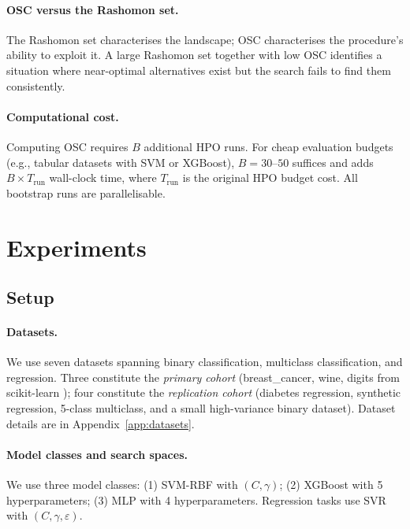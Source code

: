 \documentclass[twoside]{article}
\begin{document}
\paragraph{OSC versus the Rashomon set.}
The Rashomon set characterises the landscape; OSC characterises the
procedure's ability to exploit it. A large Rashomon set together with
low OSC identifies a situation where near-optimal alternatives exist but
the search fails to find them consistently.

\paragraph{Computational cost.}
Computing OSC requires $B$ additional HPO runs. For cheap evaluation
budgets (e.g., tabular datasets with SVM or XGBoost), $B=30$--$50$
suffices and adds $B\times T_{\mathrm{run}}$ wall-clock time, where
$T_{\mathrm{run}}$ is the original HPO budget cost. All bootstrap runs
are parallelisable.

\section{Experiments}
\label{sec:experiments}

\subsection{Setup}
\label{sec:setup_exp}

\paragraph{Datasets.} We use seven datasets spanning binary
classification, multiclass classification, and regression. Three
constitute the \emph{primary cohort} (breast\_cancer, wine, digits from
scikit-learn \citep{pedregosa2011scikit}); four constitute the
\emph{replication cohort} (diabetes regression, synthetic regression,
5-class multiclass, and a small high-variance binary dataset). Dataset
details are in Appendix~\ref{app:datasets}.

\paragraph{Model classes and search spaces.} We use three model
classes: (1) SVM-RBF with $(C, \gamma)$; (2) XGBoost with 5
hyperparameters; (3) MLP with 4 hyperparameters. Regression tasks use
SVR with $(C, \gamma, \varepsilon)$.
\end{document}
